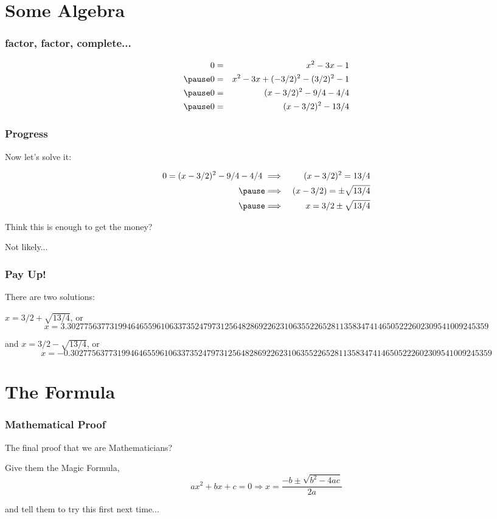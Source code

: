 \documentclass[
    10pt %
    16:9, %
]{beamer}
\begin{document}
\section{Some Algebra}

\frame %
{
  \frametitle{factor, factor, complete...}
 
 
\begin{eqnarray*}
 0 & = & x^2 -3x -1  \\ \pause
 0 & = &  x^2 -3x + (-3/2)^2 - (3/2)^2 -1  \\ \pause
 0 & = &  (x - 3/2)^2  -9/4 - 4/4  \\ \pause
 0 & = &   (x - 3/2)^2  -13/4  
\end{eqnarray*}

 

}

\frame %
{
  \frametitle{Progress}
 
 
Now let's solve it:

\begin{eqnarray*}
 0 =  (x - 3/2)^2  -9/4 - 4/4 ~ & \Longrightarrow &  ~ (x-3/2)^2 = 13/4 \\ \pause
 & \Longrightarrow &  ~ (x-3/2) = \pm \sqrt{13/4} \\ \pause
 & \Longrightarrow &  ~ x =  3/2\pm \sqrt{13/4} 
 \end{eqnarray*}
 
 \pause

Think this is enough to get the money?


\medskip
\pause

Not likely...

}

\frame %
{
  \frametitle{Pay Up!}
 
 There are two solutions: 
 
 \bigskip
 \pause
 
 $ x =  3/2 +  \sqrt{13/4}$, or
  $$x =  3.302775637731994646559610633735247973125648286922623106355226528113583474146 505222602309541009245359$$
  
  \bigskip
  \pause
  
and    $ x =  3/2 -  \sqrt{13/4}$, or
  $$x = -0.302775637731994646559610633735247973125648286922623106355226528113583474146505222602309541009245359$$

}

\section{The Formula}

\frame %
{
  \frametitle{Mathematical Proof}
 
 The final proof that we are Mathematicians?
 
\bigskip
 \pause
 
 Give them the Magic Formula,  
 $$ ax^2 + bx + c = 0 \Longrightarrow x = \frac{-b \pm \sqrt{b^2 - 4ac}}{2a}$$
 
\bigskip
 \pause
 
 and tell them to try this first next time...
 

}

 
\end{document}

